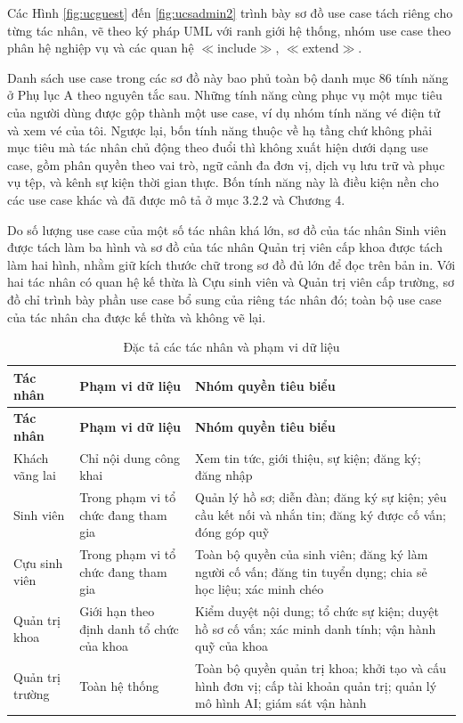 \documentclass[12pt,a4paper,oneside]{report}
\begin{document}
Các Hình \ref{fig:ucguest} đến \ref{fig:ucsadmin2} trình bày sơ đồ use case tách riêng cho từng tác nhân, vẽ theo ký pháp UML với ranh giới hệ thống, nhóm use case theo phân hệ nghiệp vụ và các quan hệ $\ll$include$\gg$, $\ll$extend$\gg$.

Danh sách use case trong các sơ đồ này bao phủ toàn bộ danh mục 86 tính năng ở Phụ lục A theo nguyên tắc sau. Những tính năng cùng phục vụ một mục tiêu của người dùng được gộp thành một use case, ví dụ nhóm tính năng vé điện tử và xem vé của tôi. Ngược lại, bốn tính năng thuộc về hạ tầng chứ không phải mục tiêu mà tác nhân chủ động theo đuổi thì không xuất hiện dưới dạng use case, gồm phân quyền theo vai trò, ngữ cảnh đa đơn vị, dịch vụ lưu trữ và phục vụ tệp, và kênh sự kiện thời gian thực. Bốn tính năng này là điều kiện nền cho các use case khác và đã được mô tả ở mục 3.2.2 và Chương 4.

Do số lượng use case của một số tác nhân khá lớn, sơ đồ của tác nhân Sinh viên được tách làm ba hình và sơ đồ của tác nhân Quản trị viên cấp khoa được tách làm hai hình, nhằm giữ kích thước chữ trong sơ đồ đủ lớn để đọc trên bản in. Với hai tác nhân có quan hệ kế thừa là Cựu sinh viên và Quản trị viên cấp trường, sơ đồ chỉ trình bày phần use case bổ sung của riêng tác nhân đó; toàn bộ use case của tác nhân cha được kế thừa và không vẽ lại.

\renewcommand{\arraystretch}{1.2}
\begin{longtable}{|>{\raggedright\arraybackslash}p{3.0cm}|>{\raggedright\arraybackslash}p{5.2cm}|>{\raggedright\arraybackslash}p{6.3cm}|}
\caption{Đặc tả các tác nhân và phạm vi dữ liệu}\label{tab:actors}\\
\hline \textbf{Tác nhân} & \textbf{Phạm vi dữ liệu} & \textbf{Nhóm quyền tiêu biểu} \\ \hline
\endfirsthead
\hline \textbf{Tác nhân} & \textbf{Phạm vi dữ liệu} & \textbf{Nhóm quyền tiêu biểu} \\ \hline
\endhead
Khách vãng lai & Chỉ nội dung công khai & Xem tin tức, giới thiệu, sự kiện; đăng ký; đăng nhập \\ \hline
Sinh viên & Trong phạm vi tổ chức đang tham gia & Quản lý hồ sơ; diễn đàn; đăng ký sự kiện; yêu cầu kết nối và nhắn tin; đăng ký được cố vấn; đóng góp quỹ \\ \hline
Cựu sinh viên & Trong phạm vi tổ chức đang tham gia & Toàn bộ quyền của sinh viên; đăng ký làm người cố vấn; đăng tin tuyển dụng; chia sẻ học liệu; xác minh chéo \\ \hline
Quản trị khoa & Giới hạn theo định danh tổ chức của khoa & Kiểm duyệt nội dung; tổ chức sự kiện; duyệt hồ sơ cố vấn; xác minh danh tính; vận hành quỹ của khoa \\ \hline
Quản trị trường & Toàn hệ thống & Toàn bộ quyền quản trị khoa; khởi tạo và cấu hình đơn vị; cấp tài khoản quản trị; quản lý mô hình AI; giám sát vận hành \\ \hline
\end{longtable}
\renewcommand{\arraystretch}{1}
\end{document}
